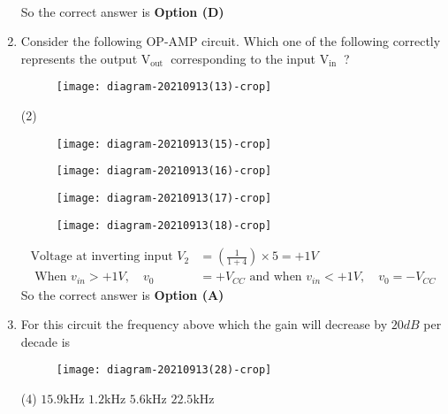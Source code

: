 \begin{enumerate}
\begin{answer}
\begin{align*}
\end{align*}
So the correct answer is \textbf{Option (D)}
\end{answer}
	\item Consider the following OP-AMP circuit.
	Which one of the following correctly represents the output $\mathrm{V}_{\text {out }}$ corresponding to the input $\mathrm{V}_{\text {in }}$ ?
{	}
\begin{figure}[H]
\centering
\texttt{[image: diagram-20210913(13)-crop]}
\end{figure}
\begin{tasks}(2)
\task[\textbf{A.}] \begin{figure}[H]
	\centering
	\texttt{[image: diagram-20210913(15)-crop]}
\end{figure}
\task[\textbf{B.}] \begin{figure}[H]
	\centering
	\texttt{[image: diagram-20210913(16)-crop]}
\end{figure}
\task[\textbf{C.}] \begin{figure}[H]
	\centering
	\texttt{[image: diagram-20210913(17)-crop]}
\end{figure}
\task[\textbf{D.}] \begin{figure}[H]
	\centering
	\texttt{[image: diagram-20210913(18)-crop]}
\end{figure}
\end{tasks}
\begin{answer}
\begin{align*}
\text{Voltage at inverting input }V_{2}&=\left(\frac{1}{1+4}\right) \times 5=+1 V\\
\text{	When }v_{i n}>+1 V, \quad v_{0}&=+V_{C C}\text{ and when }v_{i n}<+1 V, \quad v_{0}=-V_{C C}
\end{align*}
So the correct answer is \textbf{Option (A)}
\end{answer}
	\item For this circuit the frequency above which the gain will decrease by $20 d B$ per decade is
{	}
\begin{figure}[H]
\centering
\texttt{[image: diagram-20210913(28)-crop]}
\end{figure}
\begin{tasks}(4)
\task[\textbf{A.}] $15.9 \mathrm{kHz}$
\task[\textbf{B.}] $1.2 \mathrm{kHz}$
\task[\textbf{C.}]  $5.6 \mathrm{kHz}$
\task[\textbf{D.}] $22.5 \mathrm{kHz}$
\end{tasks}

\end{enumerate}
